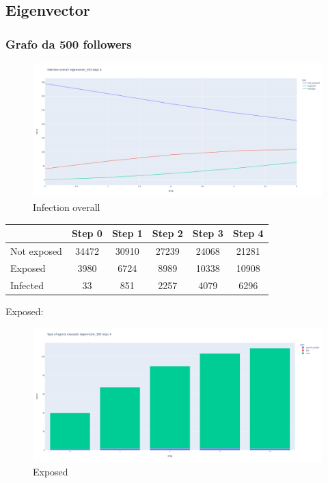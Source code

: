         
        
    \subsection{Eigenvector}
        \subsubsection{Grafo da 500 followers}
        \begin{figure}[H]
                \includegraphics[width=16cm]{resources/charts/eig_500_line.png}
                \caption{Infection overall}
                \label{fig:eig_500_line}
        \end{figure}
        
        \begin{table}[H]
            \centering
            \begin{tabular}{|l|c|c|c|c|c|}
            \hline
                        & Step 0 & Step 1 & Step 2 & Step 3 & Step 4 \\ \hline
            Not exposed & 34472  & 30910  & 27239  & 24068  & 21281  \\ \hline
            Exposed     & 3980   & 6724   & 8989   & 10338  & 10908  \\ \hline
            Infected    & 33     & 851    & 2257   & 4079   & 6296   \\ \hline
            \end{tabular}
        \end{table}
        
        Exposed:
        \begin{figure}[H]
            \includegraphics[width=16cm]{resources/charts/eig_500bar.png}
            \caption{Exposed}
            \label{fig:eig_500_bar}
        \end{figure}
        
